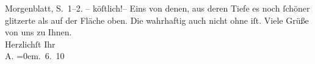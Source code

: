 \begin{ledgroupsized}[t]{13cm}
{{{                     Morgenblatt, S. 1–2.}}}\label{K_L03016-1h} – köſtlich!– Eins von denen, aus deren Tiefe
               es noch ſchöner glitzerte als auf der Fläche oben. Die wahrhaftig auch nicht ohne
               iſt. \pend
           \pstart
           Viele Grüße von uns zu Ihnen. {\\[\baselineskip]}Herzlichſt Ihr {\\[\baselineskip]}\spacefill\mbox{A.}\pend
           \leftskip=0em{}. 6. 10\pend
           
         
         \endnumbering{}\end{ledgroupsized}\begin{anhang}\end{anhang}\newcommand{\dateiname}{L03016}\newcommand{\titel}{Arthur Schnitzler an Felix Salten, 27. 6. 1910}\newcommand{\editorInnen}{Martin Anton Müller und Laura Untner}
      